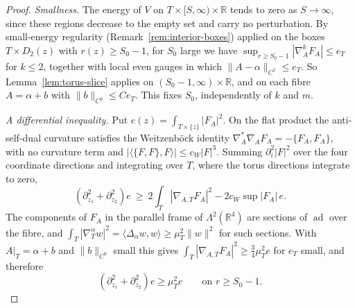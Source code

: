 \documentclass[11pt]{amsart}
\theoremstyle{definition}
\theoremstyle{remark}
\theoremstyle{plain}
\numberwithin{equation}{section}
\newcommand{\RR}{\mathbb{R}}
\newcommand{\ad}{\operatorname{ad}}
\begin{document}
\begin{proof}
\emph{Smallness.} The energy of $V$ on $T\times[S,\infty)\times\RR$ tends to zero as
$S\to\infty$, since these regions decrease to the empty set and carry no
perturbation. By small-energy regularity (Remark~\ref{rem:interior-boxes}) applied on the
boxes $T\times D_2(z)$ with $r(z)\ge S_0-1$, for $S_0$ large we have
$\sup_{r\ge S_0-1}|\nabla_A^kF_A|\le e_T$ for $k\le2$, together with local even gauges
in which $\|A-\alpha\|_{C^1}\le e_T$. So Lemma~\ref{lem:torus-slice} applies on
$(S_0-1,\infty)\times\RR$, and on each fibre $A=\alpha+b$ with $\|b\|_{C^0}\le Ce_T$. This
fixes $S_0$, independently of $k$ and $m$.

\emph{A differential inequality.} Put $e(z)=\int_{T\times\{z\}}|F_A|^2$. On the flat
product the anti-self-dual curvature satisfies the Weitzenböck identity
$\nabla_A^*\nabla_AF_A=-\{F_A,F_A\}$, with no curvature term and
$|\langle\{F,F\},F\rangle|\le c_W|F|^3$. Summing $\partial_i^2|F|^2$ over the four
coordinate directions and integrating over $T$, where the torus directions
integrate to zero,
\[
(\partial_{z_1}^2+\partial_{z_2}^2)e\ \ge\ 2\int_T|\nabla_{A,T}F_A|^2-2c_W\sup|F_A|\,e .
\]
The components of $F_A$ in the parallel frame of $\Lambda^2(\RR^4)$ are sections of
$\ad$ over the fibre, and $\int_T|\nabla^\alpha_Tw|^2=\langle\Delta_\alpha w,w\rangle\ge\mu_T^2\|w\|^2$
for such sections. With $A|_T=\alpha+b$ and $\|b\|_{C^0}$ small this gives
$\int_T|\nabla_{A,T}F_A|^2\ge\tfrac34\mu_T^2e$ for $e_T$ small, and therefore
\begin{equation}\label{eq:fibre-subharmonic}
(\partial_{z_1}^2+\partial_{z_2}^2)e\ge\mu_T^2e\qquad\text{on }r\ge S_0-1 .
\end{equation}


\end{proof}
\end{document}
